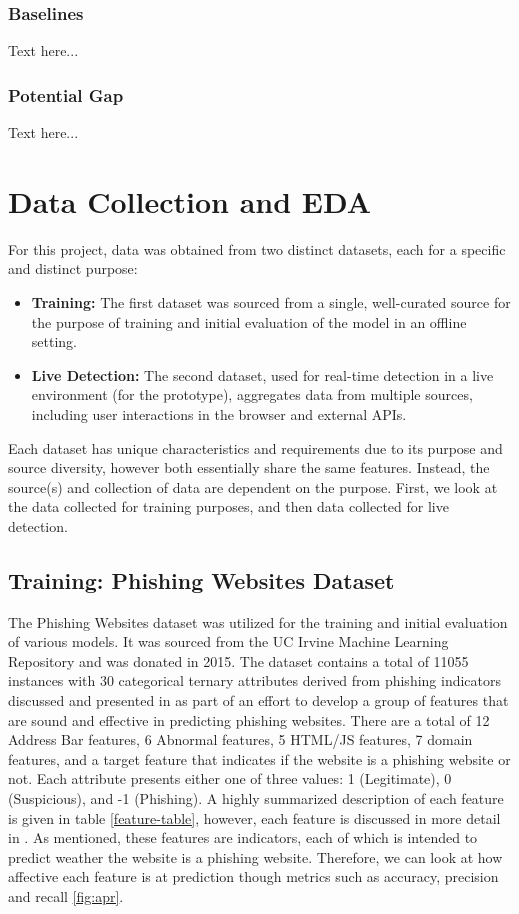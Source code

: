 \documentclass{sigkddExp}
\begin{document}
\subsubsection{Baselines}
Text here...
\subsubsection{Potential Gap}
Text here...

\section{Data Collection and EDA}
For this project, data was obtained from two distinct datasets, each for a specific and distinct purpose:
\begin{itemize}
	\item \textbf{Training:} The first dataset was sourced from a single, well-curated source for the purpose of training and initial evaluation of the model in an offline setting.
	\item \textbf{Live Detection:} The second dataset, used for real-time detection in a live environment (for the prototype), aggregates data from multiple sources, including user interactions in the browser and external APIs.
\end{itemize}
Each dataset has unique characteristics and requirements due to its purpose and source diversity, however both essentially share the same features. Instead, the source(s) and collection of data are dependent on the purpose. First, we look at the data collected for training purposes, and then data collected for live detection.
\subsection{Training: Phishing Websites Dataset}
The Phishing Websites dataset was utilized for the training and initial evaluation of various models. It was sourced from the UC Irvine Machine Learning Repository and was donated in 2015. The dataset contains a total of 11055 instances with 30 categorical ternary attributes derived from phishing indicators discussed and presented in \cite{6470857} as part of an effort to develop a group of features that are sound and effective in predicting phishing websites. There are a total of 12 Address Bar features, 6 Abnormal features, 5 HTML/JS features, 7 domain features, and a target feature that indicates if the website is a phishing website or not. Each attribute presents either one of three values: 1 (Legitimate), 0 (Suspicious), and -1 (Phishing). A highly summarized description of each feature is given in table \ref{feature-table}, however, each feature is discussed in more detail in \cite{6470857}. As mentioned, these features are indicators, each of which is intended to predict weather the website is a phishing website. Therefore, we can look at how affective each feature is at prediction though metrics such as accuracy, precision and recall \ref{fig:apr}.
\end{document}
